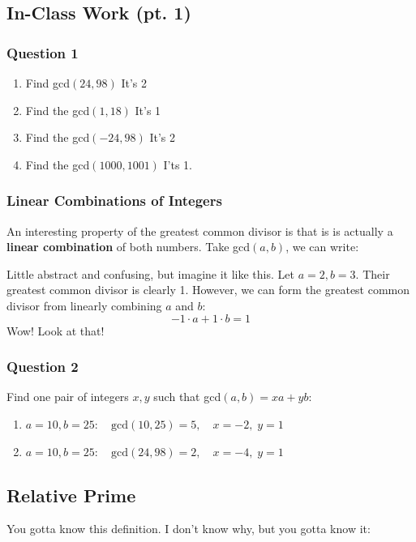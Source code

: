 \documentclass[10pt,oneside]{book}
\newcommand{\Z}{\mathbb{Z}}\newcommand{\R}{\mathbb{R}}\newcommand{\N}{\mathbb{N}}
\newcommand{\centerit}[1]{{\begin{center} #1 \end{center}}}
\begin{document}
\subsection*{In-Class Work (pt. 1)}
\subsubsection*{Question 1}
\begin{enumerate}
    \item Find gcd$(24, 98)$
    It's 2
    \item Find the gcd$(1, 18)$
    It's 1
    \item Find the gcd$(-24, 98)$ It's 2
    \item Find the gcd$(1000, 1001)$ I'ts 1. 
\end{enumerate}
\subsubsection{Linear Combinations of Integers}
An interesting property of the greatest common divisor is that is is actually a \textbf{linear combination} of both numbers. Take gcd$(a,b)$, we can write:
\centerit{
    \fbox{gcd$(a,b) = x\cdot a + y\cdot b,\quad x,y\in\Z$. }
}
Little abstract and confusing, but imagine it like this. Let $a = 2, b = 3$. Their greatest common divisor is clearly 1. However, we can form the greatest common divisor from linearly combining $a$ and $b$:
\[-1 \cdot a + 1 \cdot b = 1\]
Wow! Look at that!
\subsubsection*{Question 2}
Find one pair of integers $x, y$ such that gcd$(a,b) = xa + yb$:
\begin{enumerate}[itemsep=0pt]
    \item $a = 10, b = 25:\quad \text{gcd}(10,25)=5,\quad x = -2, \;y = 1$
    \item $a = 10, b = 25:\quad \text{gcd}(24,98)=2,\quad x = -4, \;y = 1$
\end{enumerate}
\subsection*{Relative Prime}
You gotta know this definition. I don't know why, but you gotta know it:
\begin{center}
\end{center}
\end{document}
